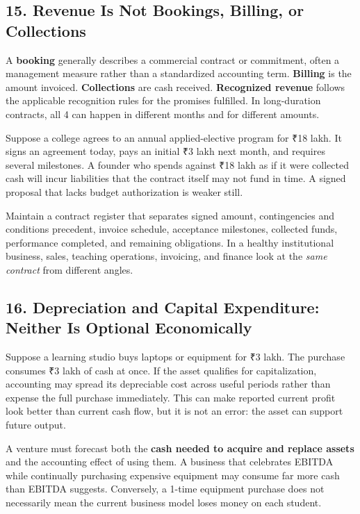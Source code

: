 \subsection*{15. Revenue Is Not Bookings, Billing, or Collections}

A \textbf{booking} generally describes a commercial contract or commitment, often a management measure rather than a standardized accounting term. \textbf{Billing} is the amount invoiced. \textbf{Collections} are cash received. \textbf{Recognized revenue} follows the applicable recognition rules for the promises fulfilled. In long-duration contracts, all 4 can happen in different months and for different amounts.

Suppose a college agrees to an annual applied-elective program for ₹18 lakh. It signs an agreement today, pays an initial ₹3 lakh next month, and requires several milestones. A founder who spends against ₹18 lakh as if it were collected cash will incur liabilities that the contract itself may not fund in time. A signed proposal that lacks budget authorization is weaker still.

Maintain a contract register that separates signed amount, contingencies and conditions precedent, invoice schedule, acceptance milestones, collected funds, performance completed, and remaining obligations. In a healthy institutional business, sales, teaching operations, invoicing, and finance look at the \emph{same contract} from different angles.

\subsection*{16. Depreciation and Capital Expenditure: Neither Is Optional Economically}

Suppose a learning studio buys laptops or equipment for ₹3 lakh. The purchase consumes ₹3 lakh of cash at once. If the asset qualifies for capitalization, accounting may spread its depreciable cost across useful periods rather than expense the full purchase immediately. This can make reported current profit look better than current cash flow, but it is not an error: the asset can support future output.

A venture must forecast both the \textbf{cash needed to acquire and replace assets} and the accounting effect of using them. A business that celebrates EBITDA while continually purchasing expensive equipment may consume far more cash than EBITDA suggests. Conversely, a 1-time equipment purchase does not necessarily mean the current business model loses money on each student.

